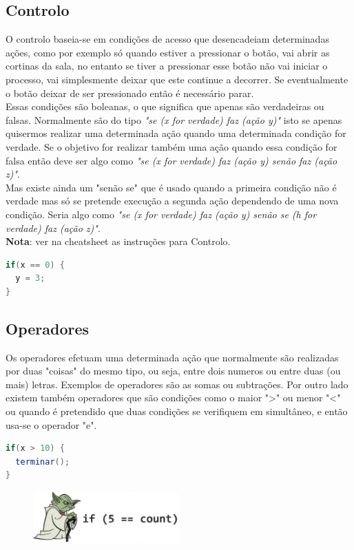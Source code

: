 \documentclass{article}
\begin{document}
\subsection{Controlo}
O controlo baseia-se em condições de acesso que desencadeiam determinadas ações, como por exemplo só quando estiver a pressionar o botão, vai abrir as cortinas da sala, no entanto se tiver a pressionar esse botão não vai iniciar o processo, vai simplesmente deixar que este continue a decorrer. Se eventualmente o botão deixar de ser pressionado então é necessário parar.\newline \\
Essas condições são boleanas, o que significa que apenas são verdadeiras ou falsas.
Normalmente são do tipo \textit{"se (x for verdade) faz (ação y)"} isto se apenas quisermos realizar uma determinada ação quando uma determinada condição for verdade. Se o objetivo for realizar também uma ação quando essa condição for falsa então deve ser algo como \textit{"se (x for verdade) faz (ação y) senão faz (ação z)"}.\newline \\
Mas existe ainda um "senão se" que é usado quando a primeira condição não é verdade mas só se pretende execução a segunda ação dependendo de uma nova condição. Seria algo como \textit{"se (x for verdade) faz (ação y) senão se (h for verdade) faz (ação z)"}. \newline \\
\textbf{Nota}: ver na cheatsheet as instruções para Controlo. \\
\begin{lstlisting}[language=Java]
if(x == 0) {
  y = 3;
}
\end{lstlisting}

\subsection{Operadores}
Os operadores efetuam uma determinada ação que normalmente são realizadas por duas "coisas" do mesmo tipo, ou seja, entre dois numeros ou entre duas (ou mais) letras. Exemplos de operadores são as somas ou subtrações. Por outro lado existem também operadores que são condições como o maior ">" ou menor "<" ou quando é pretendido que duas condições se verifiquem em simultâneo, e então usa-se o operador "e".
\begin{lstlisting}[language=Java]
if(x > 10) {
  terminar();
}
\end{lstlisting}

\begin{figure}[h]
\centering
\includegraphics[width=0.5\textwidth]{img/yoda}
\end{figure}
\end{document}
